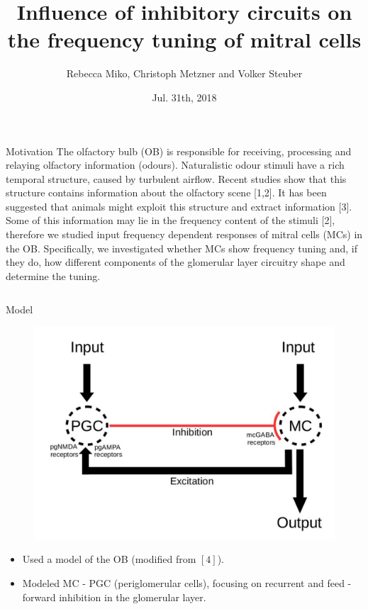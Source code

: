 \documentclass[final,hyperref={pdfpagelabels=false}]{beamer}
\title{Influence of inhibitory circuits on the frequency tuning of mitral cells}
\author[Miko]{Rebecca Miko, Christoph Metzner and Volker Steuber}
\institute{University of Hertfordshire, AL10 9AB, UK}
\date{Jul. 31th, 2018}
\begin{document}
\begin{frame}{} 
\begin{block}{Motivation}
The olfactory bulb (OB) is responsible for receiving, processing and relaying olfactory information (odours). 
Naturalistic odour stimuli have a rich temporal structure, caused by turbulent airflow.
Recent studies show that this structure contains information about the olfactory scene [1,2]. 
It has been suggested that animals might exploit this structure and extract information [3]. 
Some of this information may lie in the frequency content of the stimuli [2], therefore we studied input frequency dependent responses of mitral cells (MCs) in the OB.
Specifically, we investigated whether MCs show frequency tuning and, if they do, how different components of the glomerular layer circuitry  shape and determine the tuning.
\end{block}    

\begin{columns}[t]
\begin{column}{.48\linewidth}

\begin{block}{Model} 
\begin{figure}
\center
\includegraphics[scale=0.5]{images/Circuit_Diagram}
\end{figure}
\begin{itemize}
\item Used a model of the OB (modified from $[4]$).
\item Modeled MC - PGC (periglomerular cells), focusing on recurrent and feed - forward inhibition in the glomerular layer.
\end{itemize}
\end{block}


\end{column}
\end{columns}
\end{frame}
\end{document}

